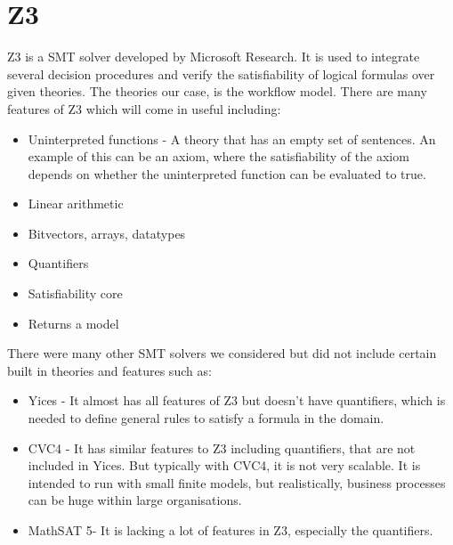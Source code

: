 \documentclass[a4paper]{report}
\begin{document}
\section{Z3}
Z3\cite{smt} is a SMT solver developed by Microsoft Research. It is used to integrate several decision procedures and verify the satisfiability of logical formulas over given theories. The theories our case, is the workflow model. There are many features of Z3 which will come in useful including:
\begin{itemize}
\item Uninterpreted functions - A theory that has an empty set of sentences. An example of this can be an axiom, where the satisfiability of the axiom depends on whether the uninterpreted function can be evaluated to true.
\item Linear arithmetic
\item Bitvectors, arrays, datatypes
\item Quantifiers
\item Satisfiability core
\item Returns a model
\end{itemize}

There were many other SMT solvers we considered but did not include certain built in theories and features such as:
\begin{itemize}
\item Yices\cite{yices} - It almost has all features of Z3 but doesn’t have quantifiers, which is needed to define general rules to satisfy a formula in the domain. 
\item CVC4\cite{cvc4} - It has similar features to Z3 including quantifiers, that are not included in Yices. But typically with CVC4, it is not very scalable. It is intended to run with small finite models, but realistically, business processes can be huge within large organisations.
\item MathSAT 5\cite{mathsat5}- It is lacking a lot of features in Z3, especially the quantifiers.
\end{itemize}
\end{document}
